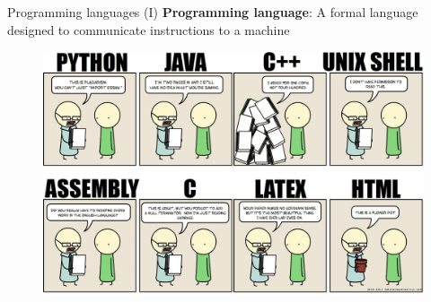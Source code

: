 \documentclass[10pt,compress]{beamer} %
\begin{document}
\begin{frame}[plain]{Programming languages (I)}
	\textbf{Programming language}: A formal language designed to communicate instructions to a machine

	\vspace{-0.2cm}
   	 	\begin{figure}[t]
		\begin{center}
		    \includegraphics[width=\linewidth]{figs/lenguajes.jpg}
		\end{center}
   	 	\end{figure}

\end{frame}
\end{document}
